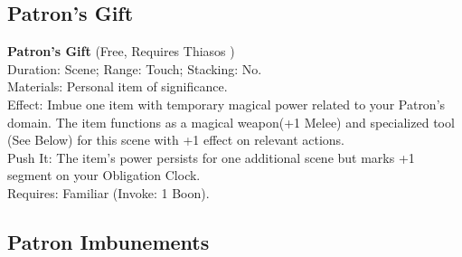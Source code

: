 \documentclass[12pt,twoside]{book}
\begin{document}
\subsection*{Patron's Gift}
\textbf{Patron's Gift} (Free, Requires Thiasos )\\
Duration: Scene; Range: Touch; Stacking: No.\\
Materials: Personal item of significance.\\
Effect: Imbue one item with temporary magical power related to your Patron's domain. The item functions as a magical weapon(+1 Melee) and specialized tool (See Below) for this scene with +1 effect on relevant actions.\\
Push It: The item's power persists for one additional scene but marks +1 segment on your Obligation Clock.\\
Requires: Familiar (Invoke: 1 Boon).

\subsection*{Patron Imbunements}
\end{document}

